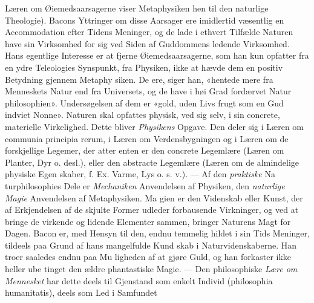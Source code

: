 \documentclass[12pt,a4paper]{book}
\begin{document}
Læren om Øiemedsaarsagerne viser Metaphysiken hen til den
naturlige Theologie). Bacons Yttringer om disse Aarsager ere
imidlertid væsentlig en Accommodation efter Tidens Meninger,
og de lade i ethvert Tilfælde Naturen have sin Virksomhed
for sig ved Siden af Guddommens ledende Virksomhed. Hans
egentlige Interesse er at fjerne Øiemedsaarsagerne, som han
kun opfatter fra en ydre Teleologies Synspunkt, fra Physiken,
ikke at hævde dem en positiv Betydning gjennem Metaphy\-%
siken. De ere, siger han, «hentede mere fra Menneskets Natur
end fra Universets, og de have i høi Grad fordærvet Natur\-%
philosophien». Undersøgelsen af dem er «gold, uden Livs\-%
frugt som en Gud indviet Nonne». Naturen skal opfattes
physisk, ved sig selv, i sin concrete, materielle Virkelighed.
Dette bliver \emph{Physikens} Opgave. Den deler sig i Læren om
communia principia rerum, i Læren om Verdensbygningen og
i Læren om de forskjellige Legemer, der atter enten er den
concrete Legemlære (Læren om Planter, Dyr o. desl.), eller den
abstracte Legemlære (Læren om de almindelige physiske Egen\-%
skaber, f. Ex. Varme, Lys o. s. v.). --- Af den \emph{praktiske} Na\-%
turphilosophies Dele er \emph{Mechaniken} Anvendelsen af Physiken,
den \emph{naturlige Magie} Anvendelsen af Metaphysiken. Ma\-%
gien er den Videnskab eller Kunst, der af Erkjendelsen af de
skjulte Former udleder forbausende Virkninger, og ved at bringe
de virkende og lidende Elementer sammen, bringer Naturens Magt
for Dagen. Bacon er, med Hensyn til den, endnu temmelig hildet
i sin Tids Meninger, tildeels paa Grund af hans mangelfulde Kund\-%
skab i Naturvidenskaberne. Han troer saaledes endnu paa Mu\-%
ligheden af at gjøre Guld, og han forkaster ikke heller ube\-%
tinget den ældre phantastiske Magie. --- Den philosophiske \emph{Lære
om Mennesket} har dette deels til Gjenstand som enkelt
Individ (philosophia humanitatis), deels som Led i Samfundet
\end{document}
